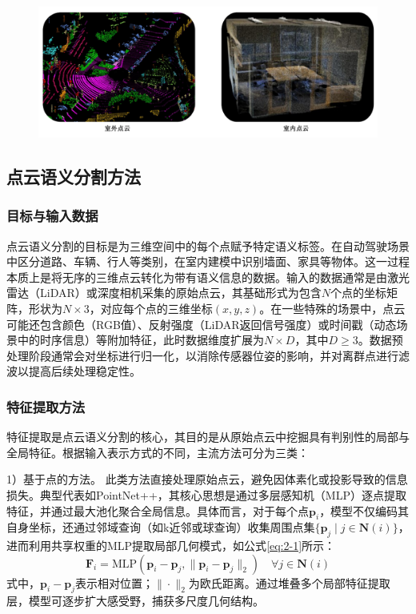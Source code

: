 \vspace{-0.1cm}
\begin{figure}[h]
    \centering
    \includegraphics[width = \textwidth, scale=0.5]{ljx/figure/2-1PC.pdf}
    \label{fig:2-1}
\end{figure}
\vspace{-0.35cm}
\subsection{点云语义分割方法}
\subsubsection{目标与输入数据}
点云语义分割的目标是为三维空间中的每个点赋予特定语义标签。在自动驾驶场景中区分道路、车辆、行人等类别，在室内建模中识别墙面、家具等物体。这一过程本质上是将无序的三维点云转化为带有语义信息的数据。输入的数据通常是由激光雷达（LiDAR）或深度相机采集的原始点云，其基础形式为包含$N$个点的坐标矩阵，形状为$N \times 3$，对应每个点的三维坐标$(x, y, z)$。在一些特殊的场景中，点云可能还包含颜色（RGB值）、反射强度（LiDAR返回信号强度）或时间戳（动态场景中的时序信息）等附加特征，此时数据维度扩展为$N \times D$，其中$D \geq 3$。数据预处理阶段通常会对坐标进行归一化，以消除传感器位姿的影响，并对离群点进行滤波以提高后续处理稳定性。

\subsubsection{特征提取方法}
特征提取是点云语义分割的核心，其目的是从原始点云中挖掘具有判别性的局部与全局特征。根据输入表示方式的不同，主流方法可分为三类：

1）基于点的方法。
此类方法直接处理原始点云，避免因体素化或投影导致的信息损失。典型代表如PointNet++，其核心思想是通过多层感知机（MLP）逐点提取特征，并通过最大池化聚合全局信息。具体而言，对于每个点$\mathbf{p}_i$，模型不仅编码其自身坐标，还通过邻域查询（如k近邻或球查询）收集周围点集$\{\mathbf{p}_j \mid j \in \mathbf{N}(i)\}$，进而利用共享权重的MLP提取局部几何模式，如公式\eqref{eq:2-1}所示：
\begin{equation}
    \label{eq:2-1}
    \mathbf{F}_i = \text{MLP}\left(\mathbf{p}_i - \mathbf{p}_j, \|\mathbf{p}_i - \mathbf{p}_j\|_2\right) \quad \forall j \in \mathbf{N}(i)
\end{equation}
式中，$\mathbf{p}_i - \mathbf{p}_j$表示相对位置；$\|\cdot\|_2$为欧氏距离。通过堆叠多个局部特征提取层，模型可逐步扩大感受野，捕获多尺度几何结构。

